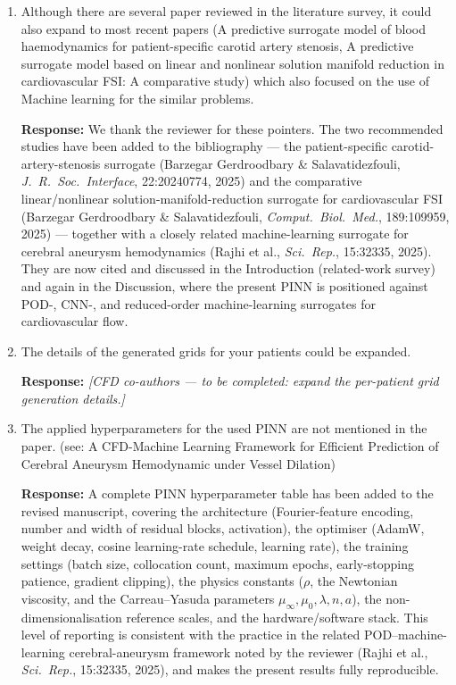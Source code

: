 \documentclass[11pt]{article}
\begin{document}
\begin{enumerate}[]
    \item Although there are several paper reviewed in the literature survey, it could also expand to most recent papers (A predictive surrogate model of blood haemodynamics for patient-specific carotid artery stenosis, A predictive surrogate model based on linear and nonlinear solution manifold reduction in cardiovascular FSI: A comparative study) which also focused on the use of Machine learning for the similar problems.

    \textbf{Response:} We thank the reviewer for these pointers. The two recommended studies have been added to the bibliography --- the patient-specific carotid-artery-stenosis surrogate (Barzegar Gerdroodbary \& Salavatidezfouli, \emph{J.~R.~Soc.~Interface}, 22:20240774, 2025) and the comparative linear/nonlinear solution-manifold-reduction surrogate for cardiovascular FSI (Barzegar Gerdroodbary \& Salavatidezfouli, \emph{Comput.~Biol.~Med.}, 189:109959, 2025) --- together with a closely related machine-learning surrogate for cerebral aneurysm hemodynamics (Rajhi et al., \emph{Sci.~Rep.}, 15:32335, 2025). They are now cited and discussed in the Introduction (related-work survey) and again in the Discussion, where the present PINN is positioned against POD-, CNN-, and reduced-order machine-learning surrogates for cardiovascular flow.

    \item The details of the generated grids for your patients could be expanded.

    \textbf{Response:} \textit{[CFD co-authors --- to be completed: expand the per-patient grid generation details.]}
    \vspace{2cm}

    \item The applied hyperparameters for the used PINN are not mentioned in the paper. (see: A CFD-Machine Learning Framework for Efficient Prediction of Cerebral Aneurysm Hemodynamic under Vessel Dilation)

    \textbf{Response:} A complete PINN hyperparameter table has been added to the revised manuscript, covering the architecture (Fourier-feature encoding, number and width of residual blocks, activation), the optimiser (AdamW, weight decay, cosine learning-rate schedule, learning rate), the training settings (batch size, collocation count, maximum epochs, early-stopping patience, gradient clipping), the physics constants ($\rho$, the Newtonian viscosity, and the Carreau--Yasuda parameters $\mu_\infty,\mu_0,\lambda,n,a$), the non-dimensionalisation reference scales, and the hardware/software stack. This level of reporting is consistent with the practice in the related POD--machine-learning cerebral-aneurysm framework noted by the reviewer (Rajhi et al., \emph{Sci.~Rep.}, 15:32335, 2025), and makes the present results fully reproducible.


\end{enumerate}
\end{document}
